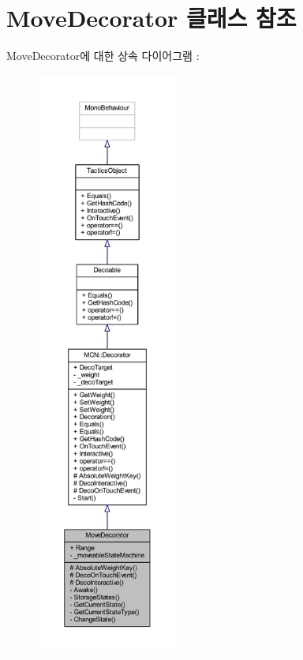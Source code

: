 \hypertarget{class_move_decorator}{}\section{Move\+Decorator 클래스 참조}
\label{class_move_decorator}


Move\+Decorator에 대한 상속 다이어그램 \+: 
\nopagebreak
\begin{figure}[H]
\begin{center}
\leavevmode
\includegraphics[height=550pt]{class_move_decorator__inherit__graph}
\end{center}
\end{figure}


